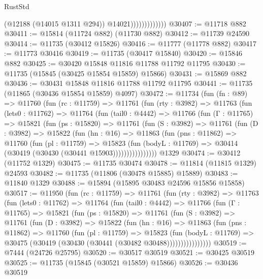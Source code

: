 \begin{lexlean}{RustStd}
\begin{coremodule}
                              (@12188 (@14015 @1311 @294))
                              @14021)))))))))))))
@30407 := @11718 @882
@30411 := @15814 (@11724 @882) (@11730 @882)
@30412 := @11739 @24590
@30414 := @11735 (@30412 @15826)
@30416 := @11777 (@11778 @882)
@30417 := @11773 @30416
@30419 := @11735 (@30417 @15840)
@30420 := @15846 @882
@30425 := @30420 @15848 @11816 @11788 @11792 @11795
@30430 := @11735 (@15845 (@30425 @15854 @15859) @15866)
@30431 := @15869 @882
@30436 := @30431 @15848 @11816 @11788 @11792 @11795
@30441 := @11735 (@11865 (@30436 @15854 @15859) @4097)
@30472 := @11734
    (fun (fn : @89) =>
    @11760
      (fun (rc : @11759) =>
      @11761
        (fun (rty : @3982) =>
        @11763
          (fun (lets0 : @11762) =>
          @11764
            (fun (tail0 : @4442) =>
            @11766
              (fun (Γ : @11765) =>
              @15821
                (fun (ps : @15820) =>
                @11761
                  (fun (S : @3982) =>
                  @11761
                    (fun (D : @3982) =>
                    @15822
                      (fun (hn : @16) =>
                      @11863
                        (fun (pns : @11862) =>
                        @11760
                          (fun (pl : @11759) =>
                          @15823
                            (fun (bodyL : @11769) =>
                            @30414 (@30419 (@30430 (@30441 @15903))))))))))))))))
    @1329
@30474 := @30412 (@11752 @1329)
@30475 := @11735 @30474
@30478 := @11814 (@11815 @1329) @24593
@30482 := @11735 (@11806 (@30478 @15885) @15889)
@30483 := @11840 @1329
@30488 := @15894 (@15895 @30483 @24596 @15856 @15858)
@30517 := @11950
    (fun (rc : @11759) =>
    @11761
      (fun (rty : @3982) =>
      @11763
        (fun (lets0 : @11762) =>
        @11764
          (fun (tail0 : @4442) =>
          @11766
            (fun (Γ : @11765) =>
            @15821
              (fun (ps : @15820) =>
              @11761
                (fun (S : @3982) =>
                @11761
                  (fun (D : @3982) =>
                  @15822
                    (fun (hn : @16) =>
                    @11863
                      (fun (pns : @11862) =>
                      @11760
                        (fun (pl : @11759) =>
                        @15823
                          (fun (bodyL : @11769) =>
                          @30475 (@30419 (@30430 (@30441 (@30482 @30488))))))))))))))))
@30519 := @7444 (@24726 @25795)
@30520 := @30517 @30519
@30521 := @30425 @30519
@30525 := @11735 (@15845 (@30521 @15859) @15866)
@30526 := @30436 @30519

\end{coremodule}
\end{lexlean}
